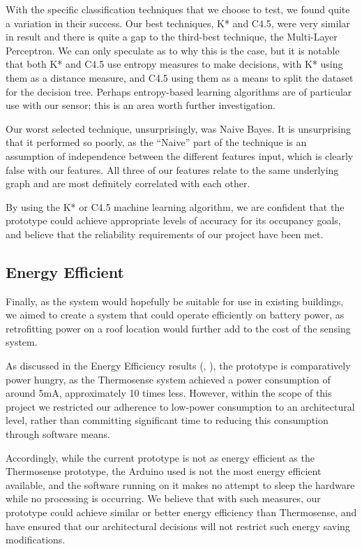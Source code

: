 \documentclass[../thesis/thesis.tex]{subfiles}
\begin{document}
With the specific classification techniques that we choose to test, we found quite a variation in their success. Our best techniques, K* and C4.5, were very similar in result and there is quite a gap to the third-best technique, the Multi-Layer Perceptron. We can only speculate as to why this is the case, but it is notable that both K* and C4.5 use entropy measures to make decisions, with K* using them as a distance measure, and C4.5 using them as a means to split the dataset for the decision tree. Perhaps entropy-based learning algorithms are of particular use with our sensor; this is an area worth further investigation.

Our worst selected technique, unsurprisingly, was Naive Bayes. It is unsurprising that it performed so poorly, as the ``Naive'' part of the technique is an assumption of independence between the different features input, which is clearly false with our features. All three of our features relate to the same underlying graph and are most definitely correlated with each other.

By using the K* or C4.5 machine learning algorithm, we are confident that the prototype could achieve appropriate levels of accuracy for its occupancy goals, and believe that the reliability requirements of our project have been met.

\subsection{Energy Efficient}
Finally, as the system would hopefully be suitable for use in existing buildings, we aimed to create a system that could operate efficiently on battery power, as retrofitting power on a roof location would further add to the cost of the sensing system.

As discussed in the Energy Efficiency results (, ), the prototype is comparatively power hungry, as the Thermosense system achieved a power consumption of around 5mA, approximately 10 times less. However, within the scope of this project we restricted our adherence to low-power consumption to an architectural level, rather than committing significant time to reducing this consumption through software means.

Accordingly, while the current prototype is not as energy efficient as the Thermosense prototype, the Arduino used is not the most energy efficient available, and the software running on it makes no attempt to sleep the hardware while no processing is occurring. We believe that with such measures, our prototype could achieve similar or better energy efficiency than Thermosense, and have ensured that our architectural decisions will not restrict such energy saving modifications.
\end{document}

